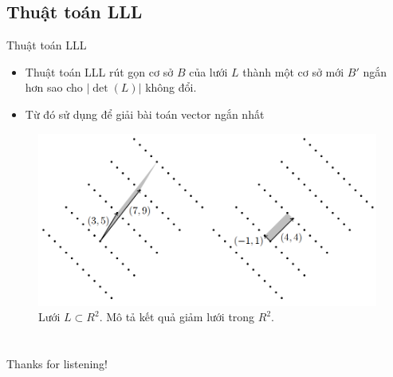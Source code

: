 \documentclass{beamer}
\numberwithin{equation}{section}
\begin{document}
\subsection{Thuật toán LLL}
\begin{frame}{Thuật toán LLL}

\begin{itemize}
\item Thuật toán LLL rút gọn cơ sở $B$ của lưới $L$ thành một cơ sở mới $B'$ ngắn hơn sao cho $|\det(L)|$ không đổi.
\item Từ đó sử dụng để giải bài toán vector ngắn nhất
\end{itemize}

\begin{figure}[H]
\centering
\includegraphics[scale = 0.5]{pictures/mo_ta_ket_qua_giam_luoi_LLL.png}
\caption{Lưới $L \subset R^2$. Mô tả kết quả giảm lưới trong $R^2$.}
\end{figure}

\end{frame}

\section*{}
\begin{frame}{}
\centering
\Huge{Thanks for listening!}
\end{frame}
\end{document}
